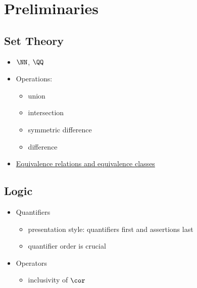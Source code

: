 \documentclass[11pt]{scrartcl}
\author{aleph}
\date{\today}
\title{}
\begin{document}
\tableofcontents

\section{Preliminaries}
\label{sec:org37e08a1}

\subsection{Set Theory}
\label{sec:org88f89af}

\begin{itemize}
\item \(\NN\), \(\QQ\)
\item Operations:
\begin{itemize}
\item union
\item intersection
\item symmetric difference
\item difference
\end{itemize}
\item \href{https://ocw.mit.edu/courses/mathematics/18-703-modern-algebra-spring-2013/lecture-notes/MIT18_703S13_pra_l_3.pdf}{Equivalence relations and equivalence classes}
\end{itemize}

\subsection{Logic}
\label{sec:org03f9ff7}

\begin{itemize}
\item Quantifiers

\begin{itemize}
\item presentation style: quantifiers first and assertions last
\item quantifier order is crucial
\end{itemize}

\item Operators

\begin{itemize}
\item inclusivity of $\cor$
\end{itemize}
\end{itemize}
\end{document}
